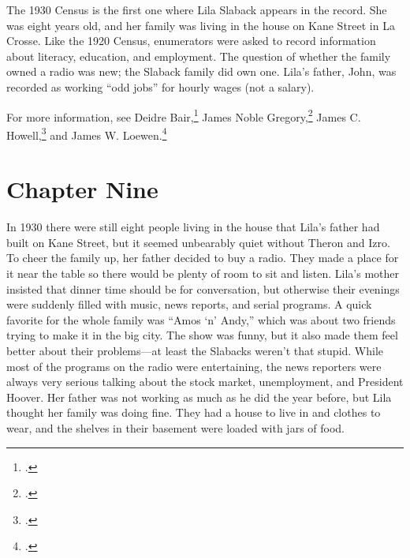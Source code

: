 \documentclass[
  american,
  letterpaper,
]{book}
\begin{document}
The 1930 Census is the first one where Lila Slaback appears in the
record. She was eight years old, and her family was living in the house
on Kane Street in La Crosse. Like the 1920 Census, enumerators were
asked to record information about literacy, education, and employment.
The question of whether the family owned a radio was new; the Slaback
family did own one. Lila's father, John, was recorded as working ``odd
jobs'' for hourly wages (not a salary).

For more information, see Deidre Bair,\footnote{.}
James Noble Gregory,\footnote{.} James C. Howell,\footnote{.} and
James W. Loewen.\footnote{.}


\chapter{Chapter Nine}\label{chapter-nine}

In 1930 there were still eight people living in the house that Lila's
father had built on Kane Street, but it seemed unbearably quiet without
Theron and Izro. To cheer the family up, her father decided to buy a
radio. They made a place for it near the table so there would be plenty
of room to sit and listen. Lila's mother insisted that dinner time
should be for conversation, but otherwise their evenings were suddenly
filled with music, news reports, and serial programs. A quick favorite
for the whole family was ``Amos `n' Andy,'' which was about two friends
trying to make it in the big city. The show was funny, but it also made
them feel better about their problems---at least the Slabacks weren't
that stupid. While most of the programs on the radio were entertaining,
the news reporters were always very serious talking about the stock
market, unemployment, and President Hoover. Her father was not working
as much as he did the year before, but Lila thought her family was doing
fine. They had a house to live in and clothes to wear, and the shelves
in their basement were loaded with jars of food.
\end{document}
